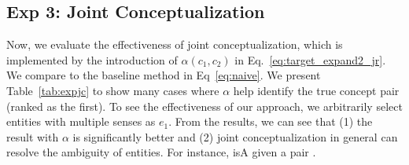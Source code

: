 %




%

\subsection{Exp 3: Joint Conceptualization}
Now, we evaluate the effectiveness of joint conceptualization, which is implemented by the introduction of $\alpha(c_1,c_2)$ in Eq.~\ref{eq:target_expand2_jr}. 
We compare to the baseline method in Eq~\ref{eq:naive}.
We present Table~\ref{tab:expjc} to show many cases where $\alpha$ help identify the true concept pair (ranked as the first).
To see the effectiveness of our approach, we arbitrarily select entities with multiple senses as $e_1$. 
From the results, we can see that (1) the result with $\alpha$ is significantly better and (2) joint conceptualization in general can resolve the ambiguity of entities. For instance,  isA  given a pair .


